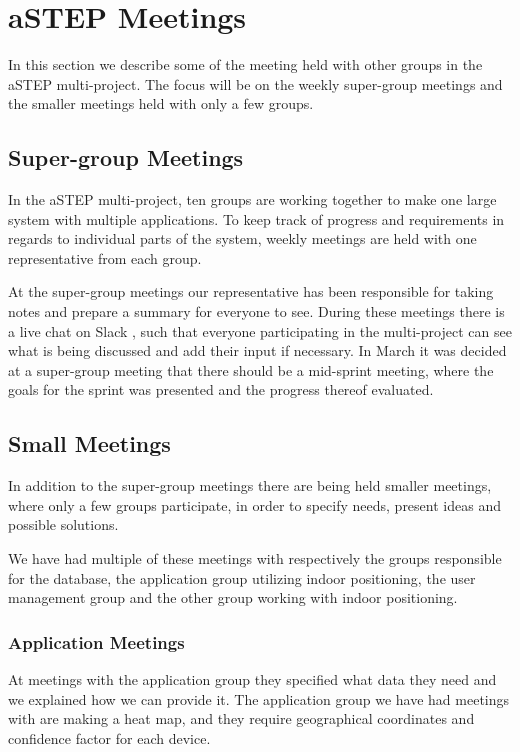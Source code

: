 \section{aSTEP Meetings}
In this section we describe some of the meeting held with other groups in the aSTEP multi-project. The focus will be on the weekly super-group meetings and the smaller meetings held with only a few groups.

\subsection{Super-group Meetings}\label{subsec:supergroup_meetings}
In the aSTEP multi-project, ten groups are working together to make one large system with multiple applications. To keep track of progress and requirements in regards to individual parts of the system, weekly meetings are held with one representative from each group.

At the super-group meetings our representative has been responsible for taking notes and prepare a summary for everyone to see. During these meetings there is a live chat on Slack \cite{slack}, such that everyone participating in the multi-project can see what is being discussed and add their input if necessary. In March it was decided at a super-group meeting that there should be a mid-sprint meeting, where the goals for the sprint was presented and the progress thereof evaluated.

\subsection{Small Meetings}\label{subsec:small_meetings}
In addition to the super-group meetings there are being held smaller meetings, where only a few groups participate, in order to specify needs, present ideas and possible solutions.

We have had multiple of these meetings with respectively the groups responsible for the database, the application group utilizing indoor positioning, the user management group and the other group working with indoor positioning.
 
\subsubsection*{Application Meetings}
At meetings with the application group they specified what data they need and we explained how we can provide it. The application group we have had meetings with are making a heat map, and they require geographical coordinates and confidence factor for each device.

